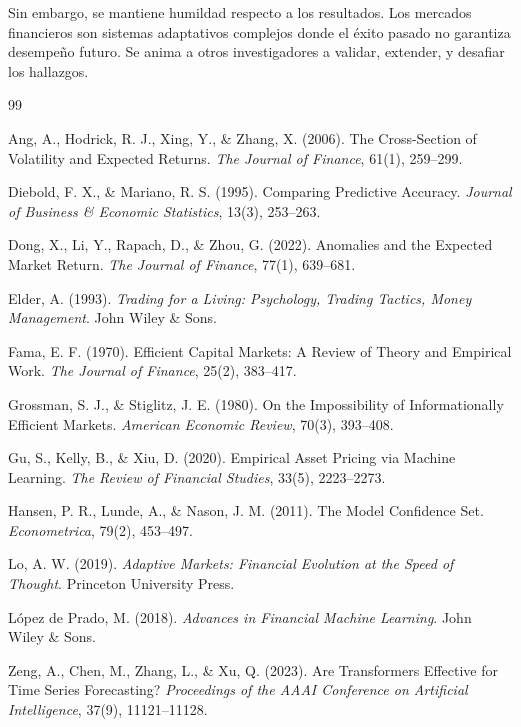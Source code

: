 \documentclass[11pt,a4paper]{article}
\begin{document}
Sin embargo, se mantiene humildad respecto a los resultados. Los mercados financieros son sistemas adaptativos complejos donde el \'exito pasado no garantiza desempe\~no futuro. Se anima a otros investigadores a validar, extender, y desafiar los hallazgos.

\newpage


\begin{thebibliography}{99}

Ang, A., Hodrick, R. J., Xing, Y., \& Zhang, X. (2006).
\newblock The Cross-Section of Volatility and Expected Returns.
\newblock \textit{The Journal of Finance}, 61(1), 259--299.

Diebold, F. X., \& Mariano, R. S. (1995).
\newblock Comparing Predictive Accuracy.
\newblock \textit{Journal of Business \& Economic Statistics}, 13(3), 253--263.

Dong, X., Li, Y., Rapach, D., \& Zhou, G. (2022).
\newblock Anomalies and the Expected Market Return.
\newblock \textit{The Journal of Finance}, 77(1), 639--681.

Elder, A. (1993).
\newblock \textit{Trading for a Living: Psychology, Trading Tactics, Money Management}.
\newblock John Wiley \& Sons.

Fama, E. F. (1970).
\newblock Efficient Capital Markets: A Review of Theory and Empirical Work.
\newblock \textit{The Journal of Finance}, 25(2), 383--417.

Grossman, S. J., \& Stiglitz, J. E. (1980).
\newblock On the Impossibility of Informationally Efficient Markets.
\newblock \textit{American Economic Review}, 70(3), 393--408.

Gu, S., Kelly, B., \& Xiu, D. (2020).
\newblock Empirical Asset Pricing via Machine Learning.
\newblock \textit{The Review of Financial Studies}, 33(5), 2223--2273.

Hansen, P. R., Lunde, A., \& Nason, J. M. (2011).
\newblock The Model Confidence Set.
\newblock \textit{Econometrica}, 79(2), 453--497.

Lo, A. W. (2019).
\newblock \textit{Adaptive Markets: Financial Evolution at the Speed of Thought}.
\newblock Princeton University Press.

L\'opez de Prado, M. (2018).
\newblock \textit{Advances in Financial Machine Learning}.
\newblock John Wiley \& Sons.

Zeng, A., Chen, M., Zhang, L., \& Xu, Q. (2023).
\newblock Are Transformers Effective for Time Series Forecasting?
\newblock \textit{Proceedings of the AAAI Conference on Artificial Intelligence}, 37(9), 11121--11128.

\end{thebibliography}
\end{document}
